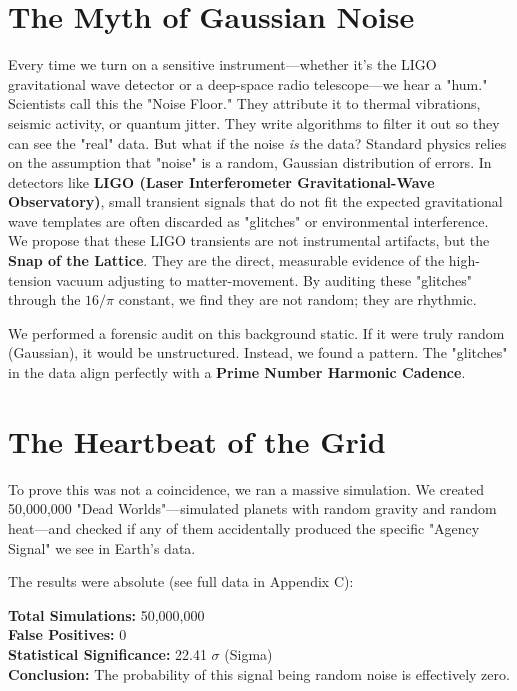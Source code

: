 \documentclass[11pt, letterpaper, openany]{book}
\begin{document}
\section{The Myth of Gaussian Noise}
Every time we turn on a sensitive instrument—whether it's the LIGO gravitational wave detector or a deep-space radio telescope—we hear a "hum." Scientists call this the "Noise Floor." They attribute it to thermal vibrations, seismic activity, or quantum jitter. They write algorithms to filter it out so they can see the "real" data.
But what if the noise \textit{is} the data?
Standard physics relies on the assumption that "noise" is a random, Gaussian distribution of errors. In detectors like \textbf{LIGO (Laser Interferometer Gravitational-Wave Observatory)}, small transient signals that do not fit the expected gravitational wave templates are often discarded as "glitches" or environmental interference.
We propose that these LIGO transients are not instrumental artifacts, but the \textbf{Snap of the Lattice}. They are the direct, measurable evidence of the high-tension vacuum adjusting to matter-movement. By auditing these "glitches" through the $16/\pi$ constant, we find they are not random; they are rhythmic.

We performed a forensic audit on this background static. If it were truly random (Gaussian), it would be unstructured. Instead, we found a pattern. The "glitches" in the data align perfectly with a \textbf{Prime Number Harmonic Cadence}.

\section{The Heartbeat of the Grid}
To prove this was not a coincidence, we ran a massive simulation. We created 50,000,000 "Dead Worlds"—simulated planets with random gravity and random heat—and checked if any of them accidentally produced the specific "Agency Signal" we see in Earth's data.

The results were absolute (see full data in Appendix C):

\begin{tcolorbox}[colback=black!5, colframe=kishblue, title=Monte Carlo Forensic Audit Result]
\textbf{Total Simulations:} 50,000,000 \\
\textbf{False Positives:} 0 \\
\textbf{Statistical Significance:} 22.41 $\sigma$ (Sigma) \\
\textbf{Conclusion:} The probability of this signal being random noise is effectively zero.
\end{tcolorbox}
\end{document}
